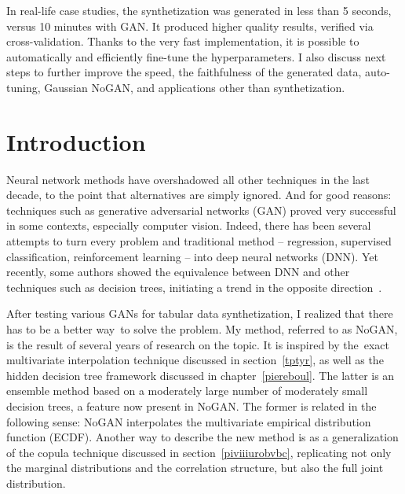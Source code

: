 \documentclass[oneside,10pt]{book}
\begin{document}
In real-life case studies, the synthetization was generated in less than 5 seconds, versus 10 minutes with GAN. It produced higher quality results, verified via cross-validation. Thanks to the very fast implementation, it is possible to automatically and efficiently fine-tune the hyperparameters. I also discuss next steps to further improve the speed, the faithfulness of the generated data, auto-tuning, Gaussian NoGAN, and applications other than synthetization.

\section{Introduction}
Neural network methods have overshadowed all other techniques in the last decade, to the point that alternatives are simply ignored. And for good reasons: techniques such as \textcolor{index}{generative adversarial networks} (GAN) proved very successful in some contexts, especially computer vision. Indeed, there has been several attempts to turn 
 every problem and traditional method -- regression, supervised classification, reinforcement learning --  into \textcolor{index}{deep neural networks} (DNN).
 Yet recently, some authors showed the equivalence between DNN and other techniques such as decision trees, initiating a trend in the opposite direction~\cite{caglar22}. 

 
After testing various GANs for tabular data synthetization, I realized that there has to be a better way~to solve the problem. My method,
 referred to as NoGAN,  is the result of several years of research on the topic.  It is inspired by the~exact multivariate interpolation technique discussed in 
 section~\ref{tptyr}, as well as the hidden decision tree framework discussed in chapter~\ref{piereboul}. The latter is an ensemble method based on a moderately large number of moderately small decision trees, a feature now present in NoGAN. The former is related in the following sense: NoGAN interpolates the \textcolor{index}{multivariate empirical distribution function} (ECDF). Another way to describe the new method is as a generalization of the \textcolor{index}{copula} technique discussed in section~\ref{piviiiurobvbc}, replicating not only the marginal distributions and the correlation structure, but also the full joint distribution.
\end{document}
